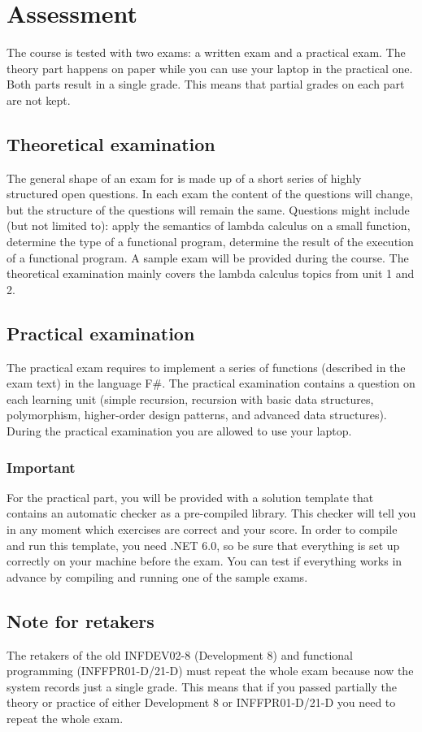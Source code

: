 \section{Assessment}
The course is tested with two exams: a written exam and a practical exam. The theory part happens on paper while you can use your laptop in the practical one. Both parts result in a single grade. This means that partial grades on each part are not kept. 

\subsection{Theoretical examination \modulecode}
The general shape of an exam for \texttt{\modulecode} is made up of a short series of highly structured open questions.
In each exam the content of the questions will change, but the structure of the questions will remain the same. Questions might include (but not limited to): apply the semantics of lambda calculus on a small function, determine the type of a functional program, determine the result of the execution of a functional program. A sample exam will be provided during the course. The theoretical examination mainly covers the lambda calculus topics from unit 1 and 2.

\subsection{Practical examination \modulecode}
The practical exam requires to implement a series of functions (described in the exam text) in the language F\#. The practical examination contains a question on each learning unit (simple recursion, recursion with basic data structures, polymorphism, higher-order design patterns, and advanced data structures). During the practical examination you are allowed to use your laptop.

\subsubsection{Important}
For the practical part, you will be provided with a solution template that contains an automatic checker as a pre-compiled library. This checker will tell you in any moment which exercises are correct and your score. In order to compile and run this template, you need .NET 6.0, so be sure that everything is set up correctly on your machine before the exam. You can test if everything works in advance by compiling and running one of the sample exams.

\subsection{Note for retakers}
The retakers of the old INFDEV02-8 (Development 8) and functional programming (INFFPR01-D/21-D) must repeat the whole exam because now the system records just a single grade. This means that if you passed partially the theory or practice of either Development 8 or INFFPR01-D/21-D you need to repeat the whole exam.
